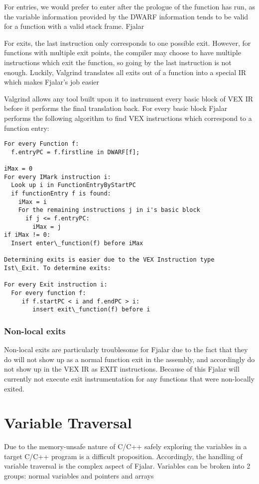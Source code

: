 \documentclass[11pt]{report}
\begin{document}
For entries, we would prefer to enter after the prologue of the
function has run, as the variable information provided by the DWARF
information tends to be valid for a function with a valid stack frame.
Fjalar

For exits, the last instruction only corresponds to one possible
exit. However, for functions with multiple exit points, the compiler
may choose to have multiple instructions which exit the function, so
going by the last instruction is not enough. Luckily, Valgrind
translates all exits out of a function into a special IR which makes
Fjalar's job easier

Valgrind allows any tool built upon it to instrument every basic block
of VEX IR before it performs the final translation back. For every
basic block Fjalar performs the following algorithm to find VEX
instructions which correspond to a function entry:

\begin{verbatim}
For every Function f:
  f.entryPC = f.firstline in DWARF[f];

iMax = 0
For every IMark instruction i:
  Look up i in FunctionEntryByStartPC 
  if functionEntry f is found:
    iMax = i
    For the remaining instructions j in i's basic block
      if j <= f.entryPC: 
        iMax = j
if iMax != 0:
  Insert enter\_function(f) before iMax

Determining exits is easier due to the VEX Instruction type
Ist\_Exit. To determine exits:

For every Exit instruction i:
  For every function f:
     if f.startPC < i and f.endPC > i:
        insert exit\_function(f) before i
\end{verbatim}

\subsubsection{Non-local exits}
Non-local exits are particularly troublesome for Fjalar due to the
fact that they do will not show up as a normal function exit in the
assembly, and accordingly do not show up in the VEX IR as EXIT
instructions. Because of this Fjalar will currently not execute exit
instrumentation for any functions that were non-locally exited.

\section{Variable Traversal}
Due to the memory-unsafe nature of C/C++ safely exploring the
variables in a target C/C++ program is a difficult
proposition. Accordingly, the handling of variable traversal is the
complex aspect of Fjalar. Variables can be broken into 2 groups:
normal variables %
and pointers and arrays
\end{document}
